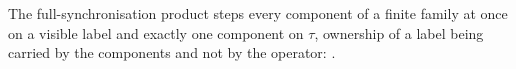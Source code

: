 \begin{definition}
  \label{def:synchronised-product}
  \leanok
  The full-synchronisation product steps every component of a finite family at once on a visible label and exactly one component on $\tau$, ownership of a label being carried by the components and not by the operator: .
\end{definition}
